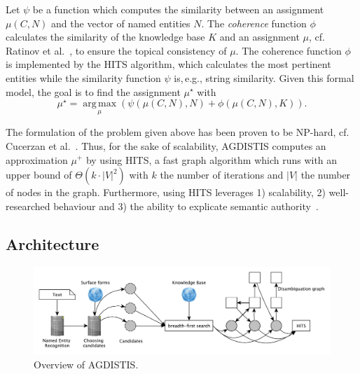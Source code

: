 Let $\psi$ be a function which computes the similarity between an assignment $\mu(C,N)$ and the vector of named entities $N$.
The \emph{coherence} function $\phi$ calculates the similarity of the knowledge base $K$ and an assignment $\mu$, cf. Ratinov et al.~\cite{rat:rot}, to ensure the topical consistency of $\mu$.
The coherence function $\phi$ is implemented by the  \ac{HITS} algorithm, which calculates the most pertinent entities while the similarity function $\psi$ is,\,e.g., string similarity.
Given this formal model, the goal is to find the assignment $\mu^\star$ with
\begin{equation*}
\mu^\star= \operatorname*{arg\,max}\limits_{\mu}\left(\psi(\mu(C,N), N) + \phi(\mu(C,N),K)\right).
\end{equation*}

The formulation of the problem given above has been proven to be NP-hard, cf. Cucerzan et al.~\cite{Cucerzan07}.
Thus, for the sake of scalability, AGDISTIS computes an approximation $\mu^{+}$ by using  \ac{HITS}, a fast graph algorithm which runs with an upper bound of $\Theta(k\cdot |V|^2)$ with $k$ the number of iterations and $|V|$ the number of nodes in the graph.
Furthermore, using \ac{HITS} leverages 1) scalability, 2) well-researched behaviour and 3) the ability to explicate semantic authority~\cite{HITS}. 

\subsection{Architecture}
\begin{figure}[h!tb]
\centering
\includegraphics[width=\linewidth]{part_02/unstructured_annotation/fig/overview.pdf}
\caption{Overview of AGDISTIS.}
\label{fig:overview_agdistis}
\end{figure}

